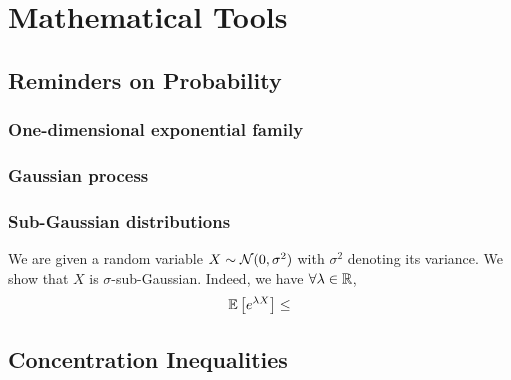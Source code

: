\chapter{Mathematical Tools}\label{app:maths}


\section{Reminders on Probability}\label{app:maths.proba}

\subsection{One-dimensional exponential family}\label{app:maths.proba.exponential}

\subsection{Gaussian process}\label{app:maths.proba.gp}

\subsection{Sub-Gaussian distributions}\label{app:maths.proba.subgaussian}

\begin{definition}

\end{definition}

\begin{example}
	We are given a random variable $X \sim \mathcal{N}(0,\sigma^2)$ with $\sigma^2$ denoting its variance. We show that $X$ is $\sigma$-sub-Gaussian. Indeed, we have $\forall \lambda\in\mathbb{R}$,
	\begin{align*}
		\mathbb{E}\left[e^{\lambda X}\right] &\leq \\
	\end{align*}
\end{example}

\section{Concentration Inequalities}\label{app:maths.concentration}

